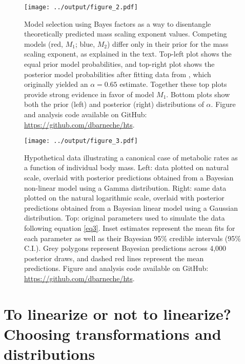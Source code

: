 \documentclass[a4paper,12pt]{article}
\begin{document}
\bigskip
\bigskip

\begin{figure}[!ht]
  \begin{center}
    \texttt{[image: ../output/figure\_2.pdf]}
  \end{center}
  \caption{Model selection using Bayes factors as a way to disentangle theoretically predicted mass scaling exponent values. Competing models (red, $M_1$; blue, $M_2$) differ only in their prior for the mass scaling exponent, as explained in the text. Top-left plot shows the equal prior model probabilities, and top-right plot shows the posterior model probabilities after fitting data from \cite{barneche2019functecol}, which originally yielded an $\alpha = 0.65$ estimate. Together these top plots provide strong evidence in favor of model $M_1$. Bottom plots show both the prior (left) and posterior (right) distributions of $\alpha$. Figure and analysis code available on GitHub: \url{https://github.com/dbarneche/hts}.}
  \label{fig2}
\end{figure}

\bigskip
\bigskip

\begin{figure}[!ht]
  \begin{center}
    \texttt{[image: ../output/figure\_3.pdf]}
  \end{center}
  \caption{Hypothetical data illustrating a canonical case of metabolic rates as a function of individual body mass. Left: data plotted on natural scale, overlaid with posterior predictions obtained from a Bayesian non-linear model using a Gamma distribution. Right: same data plotted on the natural logarithmic scale, overlaid with posterior predictions obtained from a Bayesian linear model using a Gaussian distribution. Top: original parameters used to simulate the data following equation \ref{eq3}. Inset estimates represent the mean fits for each parameter as well as their Bayesian 95\% credible intervals (95\% C.I.). Grey polygons represent Bayesian predictions across 4,000 posterior draws, and dashed red lines represent the mean predictions. Figure and analysis code available on GitHub: \url{https://github.com/dbarneche/hts}.}
  \label{fig3}
\end{figure}

\bigskip
\bigskip

\section{To linearize or not to linearize? Choosing transformations and distributions}
\label{distributions}
\end{document}
